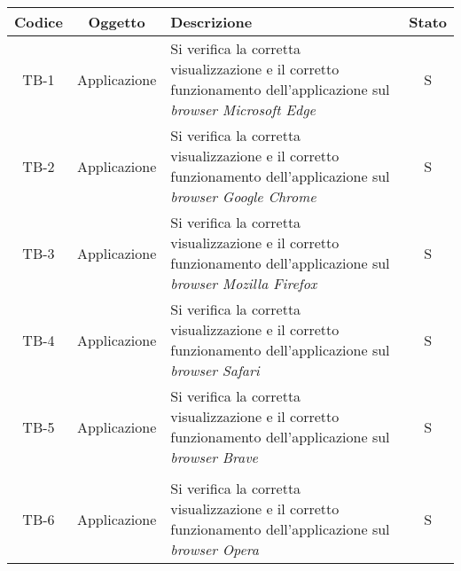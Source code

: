 \begin{center}
  \label{tab:test-compatibilita-cross-browser}
  \begin{longtable}{|c|c|p{}|c|}
  \hline
  \textbf{Codice} & \textbf{Oggetto} & \textbf{Descrizione} & \textbf{Stato}\\
  \hline
  TB-1 &Applicazione &Si verifica la corretta visualizzazione e il corretto funzionamento dell'applicazione sul \textit{browser Microsoft Edge} &S \\
  \hline
  TB-2 &Applicazione  &Si verifica la corretta visualizzazione e il corretto funzionamento dell'applicazione  sul \textit{browser Google Chrome} &S \\
  \hline
  TB-3 &Applicazione &Si verifica la corretta visualizzazione e il corretto funzionamento dell'applicazione  sul \textit{browser Mozilla Firefox} &S \\
  \hline
  TB-4 &Applicazione &Si verifica la corretta visualizzazione e il corretto funzionamento dell'applicazione  sul \textit{browser Safari} &S \\
  \hline
  TB-5 &Applicazione &Si verifica la corretta visualizzazione e il corretto funzionamento dell'applicazione  sul \textit{browser Brave} &S \\
  \hline\pagebreak\hline
  \multicolumn{4}{|c|}{\textbf{Continuazione della tabella~\ref{tab:test-compatibilita-cross-browser}}} \\
  \hline
  TB-6 &Applicazione &Si verifica la corretta visualizzazione e il corretto funzionamento dell'applicazione  sul \textit{browser Opera} &S \\
  \hline
\end{longtable}
\end{center}
